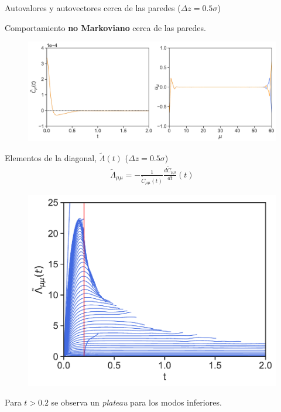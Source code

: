 \documentclass{beamer}
\begin{document}
\begin{frame}{Autovalores y autovectores cerca de las paredes ($\Delta z=0.5\sigma$)}
  
  Comportamiento \textbf{no Markoviano} cerca de las paredes. 
  \begin{figure}[h!]
\includegraphics[width=1\linewidth]{EigenvaluesVectors-WALLS-66nodes}
\end{figure}
\end{frame}

\begin{frame}{Elementos de la diagonal, $\tilde{\Lambda}(t)$ ($\Delta z=0.5\sigma$)}
\begin{align}
  \tilde{\Lambda}_{\mu\mu}=-\frac{1}{\tilde{C}_{\mu\mu}(t)}\frac{d\tilde{C}_{\mu\mu}}{dt}(t)
  \nonumber
\end{align}
\begin{figure}[h!]
\includegraphics[width=0.7\linewidth]{LambdatRec-WALLS-66nodes}
\end{figure}
  Para $t>0.2$ se observa un \textit{plateau} para los modos inferiores.
\end{frame}
\end{document}
